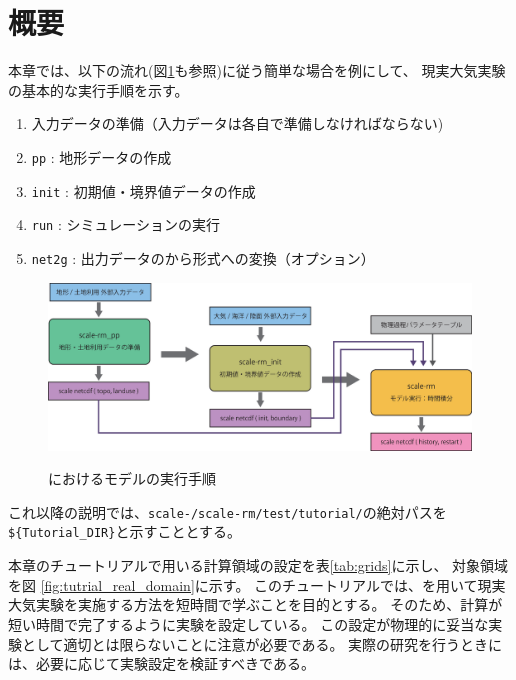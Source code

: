 \section{概要} \label{sec:tutrial_real_intro}
本章では、以下の流れ(図\ref{fig:howto}も参照)に従う簡単な場合を例にして、
現実大気実験の基本的な実行手順を示す。
\begin{enumerate}
\item  入力データの準備（入力データは各自で準備しなければならない)
\item  \texttt{pp}      : 地形データの作成
\item  \texttt{init}    : 初期値・境界値データの作成
\item  \texttt{run}     : シミュレーションの実行
\item  \texttt{net2g}   : 出力データの\netcdf から\grads 形式への変換（オプション）
\end{enumerate}

\begin{figure}[b]
\begin{center}
  \includegraphics[width=0.9\hsize]{./figure/real_procedure.eps}\\
  \caption{\scalerm におけるモデルの実行手順}
  \label{fig:howto}
\end{center}
\end{figure}


これ以降の説明では、\texttt{scale-{\version}/scale-rm/test/tutorial/}の絶対パスを
\verb|${Tutorial_DIR}|と示すこととする。


本章のチュートリアルで用いる計算領域の設定を表\ref{tab:grids}に示し、
対象領域を図 \ref{fig:tutrial_real_domain}に示す。
このチュートリアルでは、\scalerm を用いて現実大気実験を実施する方法を短時間で学ぶことを目的とする。
そのため、計算が短い時間で完了するように実験を設定している。
この設定が物理的に妥当な実験として適切とは限らないことに注意が必要である。
実際の研究を行うときには、必要に応じて実験設定を検証すべきである。


